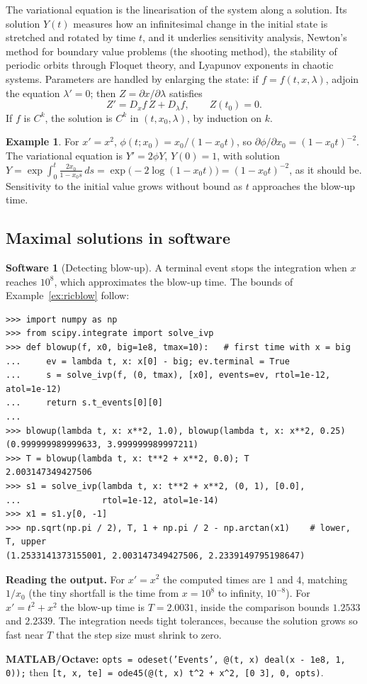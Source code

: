 \documentclass[11pt,a4paper]{article}
\numberwithin{equation}{section}
\theoremstyle{definition}
\newtheorem{exa}[thm]{Example}
\newtheorem{software}[thm]{Software}
\begin{document}
The variational equation is the linearisation of the system along a solution. Its solution $Y(t)$ measures how an infinitesimal change in the initial state is
stretched and rotated by time $t$, and it underlies sensitivity analysis, Newton's method for boundary value problems (the shooting method), the stability of
periodic orbits through Floquet theory, and Lyapunov exponents in chaotic systems. Parameters are handled by enlarging the state: if $f = f(t, x, \lambda)$, adjoin the
equation $\lambda' = 0$; then $Z = \partial x/\partial\lambda$ satisfies
\[
Z' = D_xf\,Z + D_\lambda f, \qquad Z(t_0) = 0 .
\]
If $f$ is $C^k$, the solution is $C^k$ in $(t, x_0, \lambda)$, by induction on $k$.

\begin{exa}
\label{ex:variational}
For $x' = x^2$, $\phi(t; x_0) = x_0/(1 - x_0t)$, so $\partial\phi/\partial x_0 = (1 - x_0t)^{-2}$. The variational equation is $Y' = 2\phi Y$, $Y(0) = 1$, with solution
$Y = \exp\int_0^t\frac{2x_0}{1 - x_0s}\,ds = \exp\bigl(-2\log(1 - x_0t)\bigr) = (1 - x_0t)^{-2}$, as it should be. Sensitivity to the initial value grows without bound as $t$ approaches the blow-up
time.
\end{exa}

\subsection{Maximal solutions in software}
\label{ssec:software3}

\begin{software}[Detecting blow-up]
\label{sw:blowup}
A terminal event stops the integration when $x$ reaches $10^8$, which approximates the blow-up time. The bounds of Example~\ref{ex:ricblow} follow:
{\small\begin{verbatim}
>>> import numpy as np
>>> from scipy.integrate import solve_ivp
>>> def blowup(f, x0, big=1e8, tmax=10):   # first time with x = big
...     ev = lambda t, x: x[0] - big; ev.terminal = True
...     s = solve_ivp(f, (0, tmax), [x0], events=ev, rtol=1e-12, atol=1e-12)
...     return s.t_events[0][0]
...
>>> blowup(lambda t, x: x**2, 1.0), blowup(lambda t, x: x**2, 0.25)
(0.999999989999633, 3.999999989997211)
>>> T = blowup(lambda t, x: t**2 + x**2, 0.0); T
2.003147349427506
>>> s1 = solve_ivp(lambda t, x: t**2 + x**2, (0, 1), [0.0],
...                rtol=1e-12, atol=1e-14)
>>> x1 = s1.y[0, -1]
>>> np.sqrt(np.pi / 2), T, 1 + np.pi / 2 - np.arctan(x1)    # lower, T, upper
(1.2533141373155001, 2.003147349427506, 2.2339149795198647)
\end{verbatim}}
\textbf{Reading the output.} For $x' = x^2$ the computed times are $1$ and $4$, matching $1/x_0$ (the tiny shortfall is the time from $x = 10^8$ to infinity, $10^{-8}$). For $x' = t^2 + x^2$ the blow-up time
is $T = 2.0031$, inside the comparison bounds $1.2533$ and $2.2339$. The integration needs tight tolerances, because the solution grows so fast near $T$ that the step size must
shrink to zero.

\textbf{MATLAB/Octave:} \texttt{opts = odeset('Events', @(t, x) deal(x - 1e8, 1, 0));} then \texttt{[t, x, te] = ode45(@(t, x) t\^{}2 + x\^{}2, [0 3], 0, opts)}.
\end{software}
\end{document}
